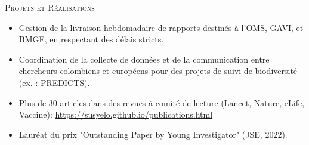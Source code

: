 \documentclass[10pt, a4paper]{article}
\newcommand{\headright}[1]{\vspace*{2.5ex}\textsc{\Large\color{cvblue}#1}\par%
     \vspace*{-2ex}{\color{cvblue}\hrulefill}\par}
\begin{document}
\begin{minipage}[t]{0.56\textwidth}
\headright{Projets et Réalisations}
\small
\begin{itemize}
\item Gestion de la livraison hebdomadaire de rapports destinés à l’OMS, GAVI, et BMGF, en respectant des délais stricts.
\item Coordination de la collecte de données et de la communication entre chercheurs colombiens et européens pour des projets de suivi de biodiversité (ex. : PREDICTS).
\item Plus de 30 articles dans des revues à comité de lecture (Lancet, Nature, eLife, Vaccine): \url{https://susyelo.github.io/publications.html}
\item Lauréat du prix "Outstanding Paper by Young Investigator" (JSE, 2022).
\end{itemize}

\end{minipage}
\end{document}

